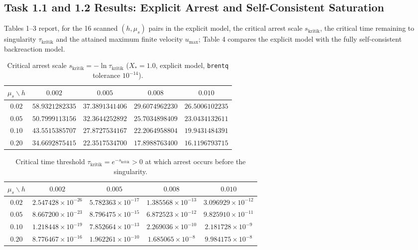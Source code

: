 \documentclass[12pt,a4paper]{article}
\begin{document}
\subsection{Task 1.1 and 1.2 Results: Explicit Arrest and Self-Consistent Saturation}

Tables 1--3 report, for the 16 scanned $(h, \mu_s)$ pairs in the explicit model, the critical arrest scale $s_{\mathrm{kritik}}$, the critical time remaining to singularity $\tau_{\mathrm{kritik}}$ and the attained maximum finite velocity $u_{\max}$; Table 4 compares the explicit model with the fully self-consistent backreaction model.

\begin{table}[htbp]
\centering
\caption{Critical arrest scale $s_{\mathrm{kritik}} = -\ln \tau_{\mathrm{kritik}}$ ($X_*=1.0$, explicit model, \texttt{brentq} tolerance $10^{-14}$).}
\vspace{0.15cm}
\begin{tabular}{c|cccc}
\hline
$\mu_s \backslash h$ & $0.002$ & $0.005$ & $0.008$ & $0.010$ \\
\hline
$0.02$ & $58.9321282335$ & $37.3891341406$ & $29.6074962230$ & $26.5006102235$ \\
$0.05$ & $50.7999113156$ & $32.3644252892$ & $25.7034898409$ & $23.0434132611$ \\
$0.10$ & $43.5515385707$ & $27.8727534167$ & $22.2064958804$ & $19.9431484391$ \\
$0.20$ & $34.6692875415$ & $22.3517534700$ & $17.8988763400$ & $16.1196793715$ \\
\hline
\end{tabular}
\end{table}

\begin{table}[htbp]
\centering
\footnotesize
\setlength{\tabcolsep}{4pt}
\caption{Critical time threshold $\tau_{\mathrm{kritik}} = e^{-s_{\mathrm{kritik}}} > 0$ at which arrest occurs before the singularity.}
\vspace{0.15cm}
\begin{tabular}{c|cccc}
\hline
$\mu_s \backslash h$ & $0.002$ & $0.005$ & $0.008$ & $0.010$ \\
\hline
$0.02$ & $2.547428 \times 10^{-26}$ & $5.782363 \times 10^{-17}$ & $1.385568 \times 10^{-13}$ & $3.096929 \times 10^{-12}$ \\
$0.05$ & $8.667200 \times 10^{-23}$ & $8.796475 \times 10^{-15}$ & $6.872523 \times 10^{-12}$ & $9.825910 \times 10^{-11}$ \\
$0.10$ & $1.218448 \times 10^{-19}$ & $7.852664 \times 10^{-13}$ & $2.269036 \times 10^{-10}$ & $2.181728 \times 10^{-9}$ \\
$0.20$ & $8.776467 \times 10^{-16}$ & $1.962261 \times 10^{-10}$ & $1.685065 \times 10^{-8}$ & $9.984175 \times 10^{-8}$ \\
\hline
\end{tabular}
\end{table}
\end{document}
